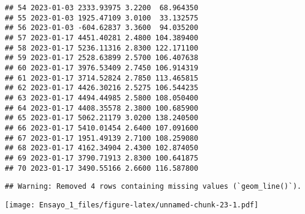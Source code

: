 \documentclass[
]{article}
\newenvironment{Shaded}{\begin{snugshade}}{\end{snugshade}}
\newcommand{\AttributeTok}[1]{\textcolor[rgb]{0.77,0.63,0.00}{#1}}
\newcommand{\FunctionTok}[1]{\textcolor[rgb]{0.00,0.00,0.00}{#1}}
\newcommand{\NormalTok}[1]{#1}
\newcommand{\OtherTok}[1]{\textcolor[rgb]{0.56,0.35,0.01}{#1}}
\newcommand{\SpecialCharTok}[1]{\textcolor[rgb]{0.00,0.00,0.00}{#1}}
\newcommand{\StringTok}[1]{\textcolor[rgb]{0.31,0.60,0.02}{#1}}
\begin{document}
\begin{verbatim}
## 54 2023-01-03 2333.93975 3.2200  68.964350
## 55 2023-01-03 1925.47109 3.0100  33.132575
## 56 2023-01-03 -604.62837 3.3600  94.035200
## 57 2023-01-17 4451.40281 2.4800 104.389400
## 58 2023-01-17 5236.11316 2.8300 122.171100
## 59 2023-01-17 2528.63899 2.5700 106.407638
## 60 2023-01-17 3976.53409 2.7450 106.914319
## 61 2023-01-17 3714.52824 2.7850 113.465815
## 62 2023-01-17 4426.30216 2.5275 106.544235
## 63 2023-01-17 4494.44985 2.5800 108.050400
## 64 2023-01-17 4408.35578 2.3800 100.685900
## 65 2023-01-17 5062.21179 3.0200 138.240500
## 66 2023-01-17 5410.01454 2.6400 107.091600
## 67 2023-01-17 1951.49139 2.7100 108.259080
## 68 2023-01-17 4162.34904 2.4300 102.874050
## 69 2023-01-17 3790.71913 2.8300 100.641875
## 70 2023-01-17 3490.55166 2.6600 116.587800
\end{verbatim}

\begin{Shaded}
\end{Shaded}

\begin{verbatim}
## Warning: Removed 4 rows containing missing values (`geom_line()`).
\end{verbatim}

\texttt{[image: Ensayo\_1\_files/figure-latex/unnamed-chunk-23-1.pdf]}
\end{document}

